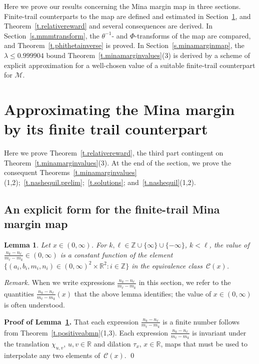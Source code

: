 \documentclass[letterpaper,11pt,oneside,reqno]{amsbook}
\newcommand{\R}{\ensuremath{\mathbb{R}}}
\newcommand{\Z}{\ensuremath{\mathbb{Z}}}
\numberwithin{figure}{chapter}
\newtheorem{lemma}[theorem]{Lemma}
\theoremstyle{definition}
\theoremstyle{definition}
\theoremstyle{definition}
\theoremstyle{definition}
\theoremstyle{definition}
\newcommand{\mc}{\mathcal}
\newcommand{\minamm}{\mathcal{M}}
\newcommand{\transmap}{\chi}
\newcommand{\PhiMac}{\Phi}
\begin{document}
Here we prove our results concerning the Mina margin map in three sections. Finite-trail counterparts to the map are defined and estimated in Section~\ref{s.approxmmm}, and Theorem~\ref{t.relativereward} and several consequences are derived. In Section~\ref{s.mmmtransform}, the $\theta^{-1}$- and $\PhiMac$-transforms of the map are compared, and Theorem~\ref{t.phithetainverse} is proved. In Section~\ref{s.minamarginmap}, the $\lambda \leq 0.999904$ bound
Theorem~\ref{t.minamarginvalues}(3) is derived by a scheme of explicit approximation for a well-chosen value of a suitable finite-trail counterpart for $\minamm$.


\section{Approximating the Mina margin by its finite trail counterpart}\label{s.approxmmm}
Here we prove Theorem~\ref{t.relativereward},  the third part contingent on Theorem~\ref{t.minamarginvalues}(3).
At the end of the section, we prove the consequent  Theorems~\ref{t.minamarginvalues}(1,2);~\ref{t.nashequil.prelim};~\ref{t.solutions}; and~\ref{t.nashequil}(1,2). 


\subsection{An explicit form for the finite-trail Mina margin map}
 \begin{lemma}\label{l.ecinvariance}
 Let $x \in (0,\infty)$. For $k,\ell \in \Z \cup \{ \infty\} \cup \{ - \infty\}$, $k < \ell$, 
 the value of $\frac{n_k - n_\ell}{m_\ell - m_k} \in (0,\infty)$
 is a constant function of the element $\big\{ (a_i,b_i,m_i,n_i) \in (0,\infty)^2 \times \R^2 : i \in \Z \big\}$ in the equivalence class~$\mc{C}(x)$.
 \end{lemma}
{\em Remark.} When we write expressions $\frac{n_k - n_\ell}{m_\ell - m_k}$ in this section, we refer to the quantities $\frac{n_k - n_\ell}{m_\ell - m_k}(x)$
that the above lemma identifies; the value of $x \in (0,\infty)$ is often understood. 
 
{ \bf Proof of Lemma~\ref{l.ecinvariance}.} That each expression  $\frac{n_k - n_\ell}{m_\ell - m_k}$ is a finite number follows from Theorem~\ref{t.positiveabmn}(1,3).  Each expression $\frac{n_k - n_\ell}{m_\ell - m_k}$ is invariant under the translation $\transmap_{u,v}$, $u,v \in \R$ and dilation $\tau_x$, $x \in \R$, maps that must be used to interpolate any two elements of~$\mc{C}(x)$. \qed
 
\end{document}
